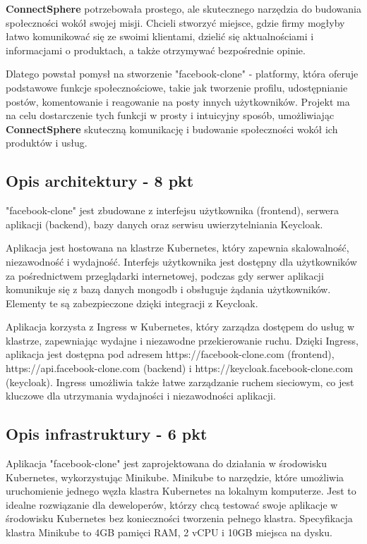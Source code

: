 \documentclass[12pt,a4paper]{article}
\begin{document}
\textbf{ConnectSphere} potrzebowała prostego, ale skutecznego narzędzia do budowania społeczności wokół swojej misji. Chcieli stworzyć miejsce, gdzie firmy mogłyby łatwo komunikować się ze swoimi klientami, dzielić się aktualnościami i informacjami o produktach, a także otrzymywać bezpośrednie opinie.

Dlatego powstał pomysł na stworzenie "facebook-clone" - platformy, która oferuje podstawowe funkcje społecznościowe, takie jak tworzenie profilu, udostępnianie postów, komentowanie i reagowanie na posty innych użytkowników. Projekt ma na celu dostarczenie tych funkcji w prosty i intuicyjny sposób, umożliwiając \textbf{ConnectSphere} skuteczną komunikację i budowanie społeczności wokół ich produktów i usług.

\subsection{Opis architektury - 8 pkt}
\label{sec:introduction}
"facebook-clone" jest zbudowane z interfejsu użytkownika (frontend), serwera aplikacji (backend), bazy danych oraz serwisu uwierzytelniania Keycloak.

Aplikacja jest hostowana na klastrze Kubernetes, który zapewnia skalowalność, niezawodność i wydajność. Interfejs użytkownika jest dostępny dla użytkowników za pośrednictwem przeglądarki internetowej, podczas gdy serwer aplikacji komunikuje się z bazą danych mongodb i obsługuje żądania użytkowników. Elementy te są zabezpieczone dzięki integracji z Keycloak.

Aplikacja korzysta z Ingress w Kubernetes, który zarządza dostępem do usług w klastrze, zapewniając wydajne i niezawodne przekierowanie ruchu. Dzięki Ingress, aplikacja jest dostępna pod adresem https://facebook-clone.com (frontend), https://api.facebook-clone.com (backend) i https://keycloak.facebook-clone.com (keycloak). Ingress umożliwia także łatwe zarządzanie ruchem sieciowym, co jest kluczowe dla utrzymania wydajności i niezawodności aplikacji.

\subsection{Opis infrastruktury - 6 pkt}
\label{sec:Users}

Aplikacja "facebook-clone" jest zaprojektowana do działania w środowisku Kubernetes, wykorzystując Minikube. Minikube to narzędzie, które umożliwia uruchomienie jednego węzła klastra Kubernetes na lokalnym komputerze. Jest to idealne rozwiązanie dla deweloperów, którzy chcą testować swoje aplikacje w środowisku Kubernetes bez konieczności tworzenia pełnego klastra. Specyfikacja klastra Minikube to 4GB pamięci RAM, 2 vCPU i 10GB miejsca na dysku.
\end{document}
